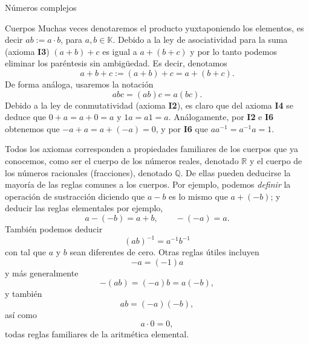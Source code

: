 \documentclass[a4paper,12pt,twoside,spanish,reqno]{amsbook}
\theoremstyle{definition}
\theoremstyle{remark}
\newcommand{\Q}{\mathbb Q}
\newcommand{\R}{\mathbb R}
\newcommand{\K}{\mathbb K}
\begin{document}
\begin{chapter}{Números complejos}
\begin{section}{Cuerpos}
        Muchas veces denotaremos el producto yuxtaponiendo los elementos,  es decir $ab := a\cdot b$, para $a,b \in \K$. Debido a la ley de asociatividad para la suma (axioma {\bf I3}) $(a+b)+c$ es igual a $a+(b+c)$ y por lo tanto podemos eliminar los paréntesis sin ambigüedad. Es decir, denotamos
        $$
        a+b+c := (a+b)+c = a+(b+c).
        $$
        De forma análoga, usaremos la notación
        $$
        abc = (ab)c = a(bc).
        $$
        Debido a la ley de conmutatividad (axioma {\bf I2}), es claro que del axioma {\bf I4} se deduce que  $0+a=a+0=a$ y $1a = a1=a$. Análogamente,  por  {\bf I2} e  {\bf I6} obtenemos que  $-a+a =   
        a+(-a)=0$, y por {\bf I6} que  $a a^{-1} = a^{-1}a=1$.
        
        
        
        Todos los axiomas corresponden a propiedades familiares de los cuerpos que ya conocemos,  como ser el cuerpo de los números reales, denotado $\R$ y el cuerpo de los números racionales (fracciones),  denotado $\Q$. De ellas pueden deducirse la mayoría de las reglas comunes a los cuerpos. Por ejemplo, podemos {\it definir} la operación de sustracción diciendo que $a-b$ es lo mismo que $a+(-b)$; y deducir las reglas elementales por ejemplo,
        \begin{equation*}
        a-(-b) = a+b, \qquad -(-a) = a.
        \end{equation*}	
        También podemos deducir
        \begin{equation*}
        (ab)^{-1} = a^{-1}b^{-1}
        \end{equation*}
        con tal que $a$ y $b$ sean diferentes de cero. Otras reglas útiles incluyen	
        \begin{equation*}
        -a = (-1)a 
        \end{equation*}					
        y más generalmente
        \begin{equation*}
        - (ab) = (-a) b = a  (-b),
        \end{equation*}	
        y  también 
        \begin{equation*}
        ab = (-a) (-b),
        \end{equation*}
        así como
        \begin{equation*}
        a\cdot 0 = 0,
        \end{equation*}
        todas reglas familiares de la aritmética elemental.
    \end{section}
    

\end{chapter}
\end{document}
